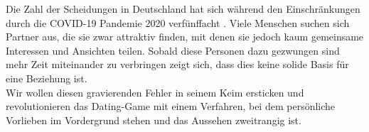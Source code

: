 Die Zahl der Scheidungen in Deutschland hat sich während den Einschränkungen durch die COVID-19 Pandemie 2020 verfünffacht \cite{scheidungen}. Viele Menschen suchen sich Partner aus, die sie zwar attraktiv finden, mit denen sie jedoch kaum gemeinsame Interessen und Ansichten teilen. Sobald diese Personen dazu gezwungen sind mehr Zeit miteinander zu verbringen zeigt sich, dass dies keine solide Basis für eine Beziehung ist. \\
Wir wollen diesen gravierenden Fehler in seinem Keim ersticken und revolutionieren das Dating-Game mit einem Verfahren, bei dem persönliche Vorlieben im Vordergrund stehen und das Aussehen zweitrangig ist.